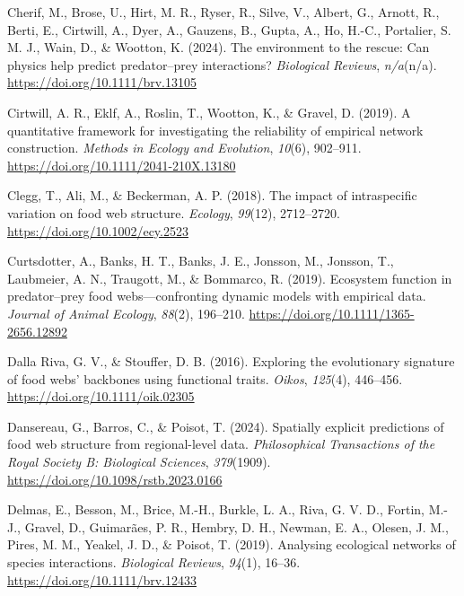 \documentclass[
]{article}
\newlength{\cslhangindent}
\newenvironment{CSLReferences}[2] %
 {\begin{list}{}{%
  \setlength{\itemindent}{0pt}
  \setlength{\leftmargin}{0pt}
  \setlength{\parsep}{0pt}
  \ifodd #1
   \setlength{\leftmargin}{\cslhangindent}
   \setlength{\itemindent}{-1\cslhangindent}
  \fi
  \setlength{\itemsep}{#2\baselineskip}}}
 {\end{list}}
\begin{document}
\begin{CSLReferences}{1}{0}
Cherif, M., Brose, U., Hirt, M. R., Ryser, R., Silve, V., Albert, G.,
Arnott, R., Berti, E., Cirtwill, A., Dyer, A., Gauzens, B., Gupta, A.,
Ho, H.-C., Portalier, S. M. J., Wain, D., \& Wootton, K. (2024). The
environment to the rescue: Can physics help predict predator--prey
interactions? \emph{Biological Reviews}, \emph{n/a}(n/a).
\url{https://doi.org/10.1111/brv.13105}

Cirtwill, A. R., Eklf, A., Roslin, T., Wootton, K., \& Gravel, D.
(2019). A quantitative framework for investigating the reliability of
empirical network construction. \emph{Methods in Ecology and Evolution},
\emph{10}(6), 902--911. \url{https://doi.org/10.1111/2041-210X.13180}

Clegg, T., Ali, M., \& Beckerman, A. P. (2018). The impact of
intraspecific variation on food web structure. \emph{Ecology},
\emph{99}(12), 2712--2720. \url{https://doi.org/10.1002/ecy.2523}

Curtsdotter, A., Banks, H. T., Banks, J. E., Jonsson, M., Jonsson, T.,
Laubmeier, A. N., Traugott, M., \& Bommarco, R. (2019). Ecosystem
function in predator--prey food webs---confronting dynamic models with
empirical data. \emph{Journal of Animal Ecology}, \emph{88}(2),
196--210. \url{https://doi.org/10.1111/1365-2656.12892}

Dalla Riva, G. V., \& Stouffer, D. B. (2016). Exploring the evolutionary
signature of food webs' backbones using functional traits. \emph{Oikos},
\emph{125}(4), 446--456. \url{https://doi.org/10.1111/oik.02305}

Dansereau, G., Barros, C., \& Poisot, T. (2024). Spatially explicit
predictions of food web structure from regional-level data.
\emph{Philosophical Transactions of the Royal Society B: Biological
Sciences}, \emph{379}(1909).
\url{https://doi.org/10.1098/rstb.2023.0166}

Delmas, E., Besson, M., Brice, M.-H., Burkle, L. A., Riva, G. V. D.,
Fortin, M.-J., Gravel, D., Guimarães, P. R., Hembry, D. H., Newman, E.
A., Olesen, J. M., Pires, M. M., Yeakel, J. D., \& Poisot, T. (2019).
Analysing ecological networks of species interactions. \emph{Biological
Reviews}, \emph{94}(1), 16--36. \url{https://doi.org/10.1111/brv.12433}


\end{CSLReferences}
\end{document}
